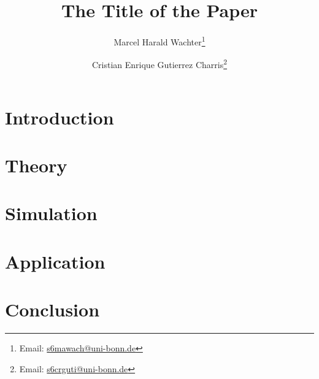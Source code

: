 \documentclass[a4paper,12pt]{article}
\author{Marcel Harald Wachter\thanks{Email: \href{mailto:s6mawach@uni-bonn.de}{s6mawach@uni-bonn.de}} \and Cristian Enrique Gutierrez Charris\thanks{Email: \href{mailto:s6crguti@uni-bonn.de}{s6crguti@uni-bonn.de}}}
\title{The Title of the Paper}
\begin{document}
\maketitle
\thispagestyle{empty}

\begin{singlespace}
\begin{abstract}

\end{abstract}
\end{singlespace}

\newpage
{}
\section{Introduction}

\section{Theory}

\section{Simulation}

\section{Application}

\section{Conclusion}
\end{document}
